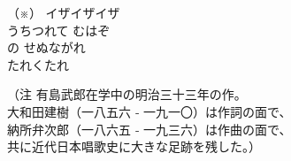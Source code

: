 \documentclass[10pt,b5j]{tarticle} %
\begin{document}
\begin{enumerate}
\begin{minipage}[c]{\blocksize}
    \end{minipage}
    \begin{minipage}[c]{0.5\hsize}

        \vspace{\linespace}
        （※） 
        イザイザイザ\\
        うちつれて
        むはぞ\\
        の
        せぬながれ\\
        たれくたれ\\

    \end{minipage}
    \begin{minipage}[c]{0.5\hsize}

        \vspace{\linespace}
        （注 有島武郎在学中の明治三十三年の作。\\
        大和田建樹（一八五六 ‐ 一九一〇）は作詞の面で、\\
        納所弁次郎（一八六五 ‐ 一九三六）は作曲の面で、\\
        共に近代日本唱歌史に大きな足跡を残した。）

    \end{minipage}
\end{enumerate} %
\end{document}
